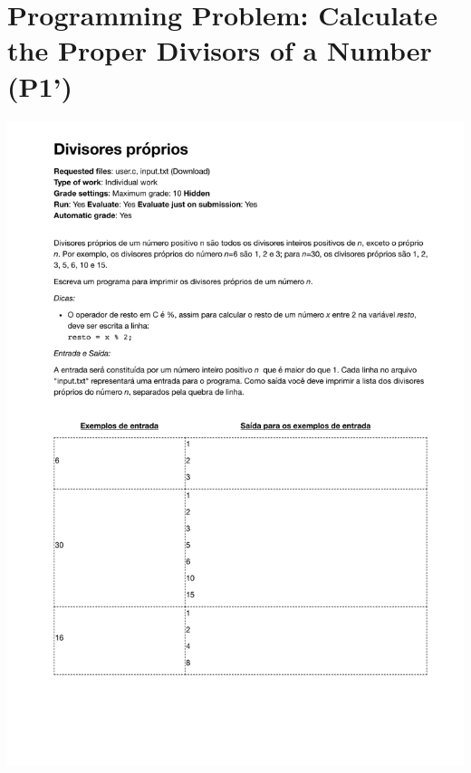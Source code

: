 \section{Programming Problem: Calculate the Proper Divisors of a Number (P1')}
\label{annex:pilot-study-p1}
\includegraphics[page=1,width=1\textwidth]{images/annex/pilot-study-p1.pdf}

\newpage
